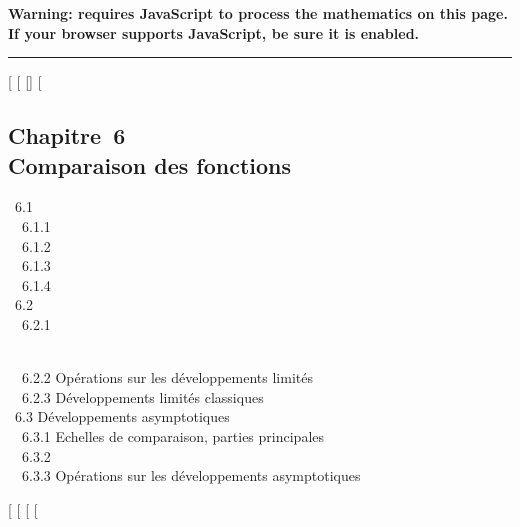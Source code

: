 \textbf{Warning: 
requires JavaScript to process the mathematics on this page.\\ If your
browser supports JavaScript, be sure it is enabled.}

\begin{center}\rule{3in}{0.4pt}\end{center}

{[}
{[}
{[}{]}
{[}

\subsection{Chapitre~6\\Comparaison des fonctions}

~6.1  \\
~~6.1.1  \\ ~~6.1.2
 \\
~~6.1.3  \\ ~~6.1.4
 \\ ~6.2
 \\ ~~6.2.1

\\ ~~6.2.2 {Opérations sur les
développements limités} \\ ~~6.2.3
{Développements limités
classiques} \\ ~6.3 {Développements
asymptotiques} \\ ~~6.3.1
{Echelles de comparaison, parties
principales} \\ ~~6.3.2
 \\
~~6.3.3 {Opérations sur les
développements asymptotiques}

{[}
{[}
{[}
{[}

